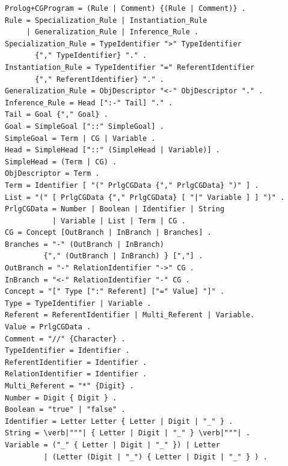 \documentclass{book}
\begin{document}
\begin{verbatim}
Prolog+CGProgram = (Rule | Comment) {(Rule | Comment)} .
Rule = Specialization_Rule | Instantiation_Rule 
     | Generalization_Rule | Inference_Rule .
Specialization_Rule = TypeIdentifier ">" TypeIdentifier
       {"," TypeIdentifier} "." .
Instantiation_Rule = TypeIdentifier "=" ReferentIdentifier
       {"," ReferentIdentifier} "." .
Generalization_Rule = ObjDescriptor "<-" ObjDescriptor "." .
Inference_Rule = Head [":-" Tail] "." .
Tail = Goal {"," Goal} .
Goal = SimpleGoal ["::" SimpleGoal] .
SimpleGoal = Term | CG | Variable .
Head = SimpleHead ["::" (SimpleHead | Variable)] .
SimpleHead = (Term | CG) .
ObjDescriptor = Term .
Term = Identifier [ "(" PrlgCGData {"," PrlgCGData} ")" ] .
List = "(" [ PrlgCGData {"," PrlgCGData} [ "|" Variable ] ] ")" .
PrlgCGData = Number | Boolean | Identifier | String
           | Variable | List | Term | CG .
CG = Concept [OutBranch | InBranch | Branches] .
Branches = "-" (OutBranch | InBranch) 
         {"," (OutBranch | InBranch) } [","] .
OutBranch = "-" RelationIdentifier "->" CG .
InBranch = "<-" RelationIdentifier "-" CG .
Concept = "[" Type [":" Referent] ["=" Value] "]" .
Type = TypeIdentifier | Variable .
Referent = ReferentIdentifier | Multi_Referent | Variable.
Value = PrlgCGData .
Comment = "//" {Character} .
TypeIdentifier = Identifier .
ReferentIdentifier = Identifier .
RelationIdentifier = Identifier .
Multi_Referent = "*" {Digit} .
Number = Digit { Digit } .
Boolean = "true" | "false" .
Identifier = Letter Letter { Letter | Digit | "_" } .
String = \verb|"""| { Letter | Digit | "_" } \verb|"""| .
Variable = ("_" { Letter | Digit | "_" }) | Letter 
         | (Letter (Digit | "_") { Letter | Digit | "_" } ) .
\end{verbatim}
\end{document}

